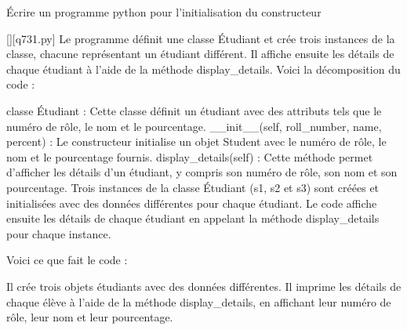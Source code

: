         \question
        Écrire un programme python pour l'initialisation du constructeur
        \par
        \begin{solution}
            \renewcommand{\nomfichier}{q731.py}
            \pythonfile{\chemincode \nomfichier}[][\nomfichier]
            Le programme définit une classe Étudiant et crée trois instances de la classe, chacune représentant un étudiant différent. Il affiche ensuite les détails de chaque étudiant à l'aide de la méthode display_details. Voici la décomposition du code :

    classe Étudiant : Cette classe définit un étudiant avec des attributs tels que le numéro de rôle, le nom et le pourcentage.
    __init__(self, roll_number, name, percent) : Le constructeur initialise un objet Student avec le numéro de rôle, le nom et le pourcentage fournis.
    display_details(self) : Cette méthode permet d'afficher les détails d'un étudiant, y compris son numéro de rôle, son nom et son pourcentage.
    Trois instances de la classe Étudiant (s1, s2 et s3) sont créées et initialisées avec des données différentes pour chaque étudiant.
    Le code affiche ensuite les détails de chaque étudiant en appelant la méthode display_details pour chaque instance.

Voici ce que fait le code :

    Il crée trois objets étudiants avec des données différentes.
    Il imprime les détails de chaque élève à l'aide de la méthode display_details, en affichant leur numéro de rôle, leur nom et leur pourcentage.
        \end{solution}
        

